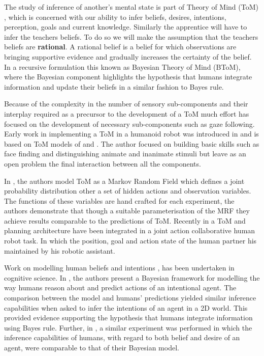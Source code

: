 
The study of inference of another's mental state is part of Theory of Mind (ToM) \cite{Towards_a_ToM_2010}, which is concerned 
with our ability to infer beliefs, desires, intentions, perception,
goals and current knowledge. Similarly the apprentice will have to infer the teachers beliefs. To do so we will  make the 
assumption that the teachers beliefs are \textbf{rational}. 
A rational belief is a belief for which observations are bringing supportive evidence and 
gradually increases the certainty of the belief. In a recursive formulation this known as Bayesian Theory of Mind (BToM),
where the Bayesian component highlights the hypothesis that humans integrate information and update their beliefs in a similar 
fashion to Bayes rule.

Because of the complexity in the number of sensory sub-components and their interplay required as a precursor to the development
of a ToM much effort has focused on the development of necessary sub-components such as gaze following.
Early work in implementing a ToM in a humanoid robot was introduced in \cite{ToM_humanoid} and is based on ToM models of \cite{Leslie_TOMM} 
and \cite{Baron-Cohen}. The author focused on building basic skills such as face finding and distinguishing animate and inanimate 
stimuli but leave as an open problem the final interaction between all the components.

In \cite{MRF_ToM}, the authors model ToM as a Markov Random Field which defines a joint probability distribution other a set of
hidden actions and observation variables. The functions of these variables are hand crafted for each experiment, the authors demonstrate
that though a suitable parameterisation of the MRF they achieve results comparable to the predictions of ToM.
Recently in \cite{ToM_HRI_2106} a ToM and planning architecture have been integrated in a joint action collaborative human robot task. 
In which the position, goal and action state of the human partner his maintained by his robotic assistant.

Work on modelling human beliefs and intentions \cite{Bake_Saxe_Tene_2011}, \cite{Richardson1_Baker1_Tenenbaum1_Saxe1_2012} 
has been undertaken in cognitive science. In \cite{Bake_Tene_Saxe_2006}, the authors present a Bayesian framework for modelling the way humans reason
about and predict actions of an intentional agent. The comparison between the model and humans' predictions 
yielded similar inference capabilities when asked to infer the intentions of an agent in a 2D world.
This provided evidence supporting the hypothesis that humans integrate information using Bayes rule. Further, in
\cite{Bake_Saxe_Tene_2011}, a similar experiment was performed in which the inference capabilities of humans,
with regard to both belief and desire of an agent, were comparable to that of their Bayesian model. 

